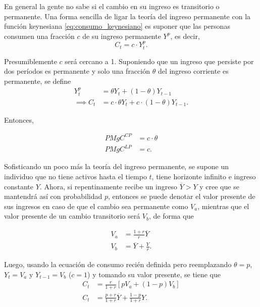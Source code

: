 \documentclass[DeGregorioResumen]{subfiles}
\begin{document}
En general la gente no sabe si el cambio en su ingreso es transitorio o permanente. Una forma sencilla de ligar la teoría del ingreso permanente con la función keynesiana \eqref{eq:consumo_keynesiano} es suponer que las personas consumen una fracción $c$ de su ingreso permanente $Y^p$, es decir,
\begin{equation*}
C_t=c\cdot Y^p_t.
\end{equation*}

Presumiblemente $c$ será cercano a 1. Suponiendo que un ingreso que persiste por dos períodos es permanente y solo una fracción $\theta$ del ingreso corriente es permanente, se define
\begin{align*}
Y^p_t &= \theta Y_t+(1-\theta)Y_{t-1} \\
\implies C_t &= c\cdot \theta Y_t+c\cdot(1-\theta)Y_{t-1}.
\end{align*}

Entonces,

\begin{align*}
PMgC^{CP} &= c\cdot\theta \\
PMgC^{LP} &= c.
\end{align*}

Sofisticando un poco más la teoría del ingreso permanente, se supone un individuo que no tiene activos hasta el tiempo $t$, tiene horizonte infinito e ingreso constante $Y$. Ahora, si repentinamente recibe un ingreso $\overline{Y}>Y$ y cree que se mantendrá así con probabilidad $p$, entonces se puede denotar el valor presente de sus ingresos en caso de que el cambio sea permanente como $V_a$, mientras que el valor presente de un cambio transitorio será $V_b$, de forma que

\begin{align*}
V_a &= \frac{1+r}{r}\overline{Y} \\
V_b &= \overline{Y}+\frac{Y}{r}.
\end{align*}

Luego, usando la ecuación de consumo recién definida pero reemplazando $\theta=p$, $Y_t=V_a$ y $Y_{t-1}=V_b$ ($c=1$) y tomando su valor presente, se tiene que
\begin{align*}
C_t &= \frac{r}{1+r}[pV_a+(1-p)V_b] \\
C_t &= \frac{p+r}{1+r}\overline{Y}+\frac{1-p}{1+r}Y.
\end{align*}
\end{document}
